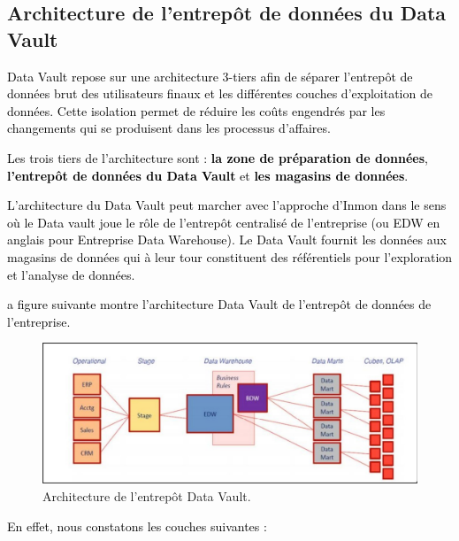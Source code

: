 \documentclass[a4paper,12pt]{report}
\begin{document}
\subsection{Architecture de l’entrepôt de données du Data Vault}

\textcolor{black}{Data Vault repose sur une architecture 3-tiers afin de séparer l’entrepôt de données brut des utilisateurs finaux et les différentes couches d’exploitation de données. Cette isolation permet de réduire les coûts engendrés par les changements qui se produisent dans les processus d’affaires.}

\textcolor{black}{Les trois tiers de l’architecture sont : \textbf{la zone de préparation de données}, \textbf{l’entrepôt de données du Data Vault} et \textbf{les magasins de données}.}


\textcolor{black}{L’architecture du Data Vault peut marcher avec l’approche d’Inmon dans le sens où le Data vault joue le rôle de l’entrepôt centralisé de l’entreprise (ou EDW en anglais pour Entreprise Data Warehouse)\citep{awel2014}. Le Data Vault fournit les données aux magasins de données qui à leur tour constituent des référentiels pour l’exploration et l’analyse de données.
}

\textcolor{black}{a figure suivante montre l’architecture Data Vault de l’entrepôt de données de l’entreprise.}

\begin{figure}[H]

\begin{center}
\includegraphics[width=0.9\linewidth]{./images/22}
\end{center}

\caption{Architecture de l'entrepôt Data Vault. \citep{awel2014}}
\label{fig:22}

\end{figure}


\textcolor{black}{En effet, nous constatons les couches suivantes \citep{awel2014}:}
\end{document}
